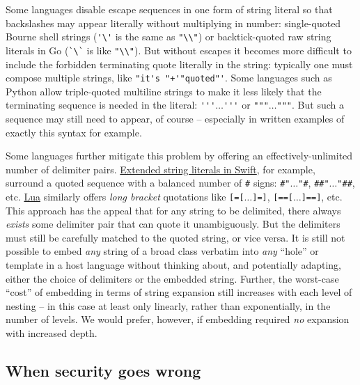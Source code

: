 Some languages disable escape sequences in one form of string literal
so that backslashes may appear literally without multiplying in number:
\eg single-quoted Bourne shell strings (\verb|'\'| is the same as \verb|"\\"|)
or backtick-quoted raw string literals
in Go (\verb|`\`| is like \verb|"\\"|).
But without escapes it becomes more difficult to include
the forbidden terminating quote literally in the string:
typically one must compose multiple strings,
like \verb|"it's "+'"quoted"'|.
Some languages such as Python allow triple-quoted multiline strings
to make it less likely that the terminating sequence is needed in the literal:
\eg \verb|'''|$\dots$\verb|'''| or \verb|"""|$\dots$\verb|"""|.
But such a sequence may still need to appear, of course --
especially in written examples of exactly this syntax for example.

Some languages further mitigate this problem
by offering an effectively-unlimited number of delimiter pairs.
\href{https://docs.swift.org/swift-book/LanguageGuide/StringsAndCharacters.html#ID286}{Extended string literals in Swift}, for example,
surround a quoted sequence with a balanced number of \verb|#| signs:
\eg \verb|#"|$\dots$\verb|"#|, \verb|##"|$\dots$\verb|"##|, etc.
\href{https://www.lua.org/manual/5.1/manual.html}{Lua}
similarly offers \emph{long bracket} quotations
like \verb|[=[|$\dots$\verb|]=]|, \verb|[==[|$\dots$\verb|]==]|, etc.
This approach has the appeal that for any string to be delimited,
there always \emph{exists} some delimiter pair
that can quote it unambiguously.
But the delimiters must still be carefully matched to the quoted string,
or vice versa.
It is still not possible to embed \emph{any} string of a broad class
verbatim into \emph{any} ``hole'' or template in a host language
without thinking about, and potentially adapting,
either the choice of delimiters or the embedded string.
Further, the worst-case ``cost'' of embedding in terms of string expansion
still increases with each level of nesting --
in this case
at least only linearly, rather than exponentially, in the number of levels.
We would prefer, however, if embedding
required \emph{no} expansion with increased depth.



\subsection{When security goes wrong}

